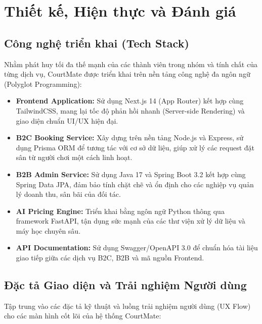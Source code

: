 \section{Thiết kế, Hiện thực và Đánh giá}

\subsection{Công nghệ triển khai (Tech Stack)}
Nhằm phát huy tối đa thế mạnh của các thành viên trong nhóm và tính chất của từng dịch vụ, CourtMate được triển khai trên nền tảng công nghệ đa ngôn ngữ (Polyglot Programming):

\begin{itemize}
    \item \textbf{Frontend Application:} Sử dụng Next.js 14 (App Router) kết hợp cùng TailwindCSS, mang lại tốc độ phản hồi nhanh (Server-side Rendering) và giao diện chuẩn UI/UX hiện đại.    \item \textbf{B2C Booking Service:} Xây dựng trên nền tảng Node.js và Express, sử dụng Prisma ORM để tương tác với cơ sở dữ liệu, giúp xử lý các request đặt sân từ người chơi một cách linh hoạt.    \item \textbf{B2B Admin Service:} Sử dụng Java 17 và Spring Boot 3.2 kết hợp cùng Spring Data JPA, đảm bảo tính chặt chẽ và ổn định cho các nghiệp vụ quản lý doanh thu, sân bãi của đối tác.    \item \textbf{AI Pricing Engine:} Triển khai bằng ngôn ngữ Python thông qua framework FastAPI, tận dụng sức mạnh của các thư viện xử lý dữ liệu và máy học chuyên sâu.    \item \textbf{API Documentation:} Sử dụng Swagger/OpenAPI 3.0 để chuẩn hóa tài liệu giao tiếp giữa các dịch vụ B2C, B2B và mã nguồn Frontend.\end{itemize}

\subsection{Đặc tả Giao diện và Trải nghiệm Người dùng}
Tập trung vào các đặc tả kỹ thuật và luồng trải nghiệm người dùng (UX Flow) cho các màn hình cốt lõi của hệ thống CourtMate:

